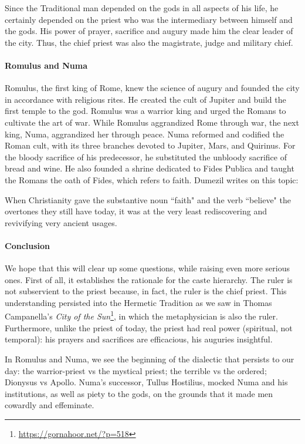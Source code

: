 Since the Traditional man depended on the gods in all aspects of his life, he certainly depended on the priest who was the intermediary between himself and the gods. His power of prayer, sacrifice and augury made him the clear leader of the city. Thus, the chief priest was also the magistrate, judge and military chief.

\paragraph{Romulus and Numa}
Romulus, the first king of Rome, knew the science of augury and founded the city in accordance with religious rites. He created the cult of Jupiter and build the first temple to the god. Romulus was a warrior king and urged the Romans to cultivate the art of war. While Romulus aggrandized Rome through war, the next king, Numa, aggrandized her through peace. Numa reformed and codified the Roman cult, with its three branches devoted to Jupiter, Mars, and Quirinus. For the bloody sacrifice of his predecessor, he substituted the unbloody sacrifice of bread and wine. He also founded a shrine dedicated to Fides Publica and taught the Romans the oath of Fides, which refers to faith. Dumezil writes on this topic:

\begin{quotex}
When Christianity gave the substantive noun ``faith" and the verb ``believe" the overtones they still have today, it was at the very least rediscovering and revivifying very ancient usages. 

\end{quotex}
\paragraph{Conclusion}
We hope that this will clear up some questions, while raising even more serious ones. First of all, it establishes the rationale for the caste hierarchy. The ruler is not subservient to the priest because, in fact, the ruler is the chief priest. This understanding persisted into the Hermetic Tradition as we saw in Thomas Campanella's \textit{City of the Sun}\footnote{\url{https://gornahoor.net/?p=518}}, in which the metaphysician is also the ruler. Furthermore, unlike the priest of today, the priest had real power (spiritual, not temporal): his prayers and sacrifices are efficacious, his auguries insightful.

In Romulus and Numa, we see the beginning of the dialectic that persists to our day: the warrior-priest vs the mystical priest; the terrible vs the ordered; Dionysus vs Apollo. Numa's successor, Tullus Hostilius, mocked Numa and his institutions, as well as piety to the gods, on the grounds that it made men cowardly and effeminate.

